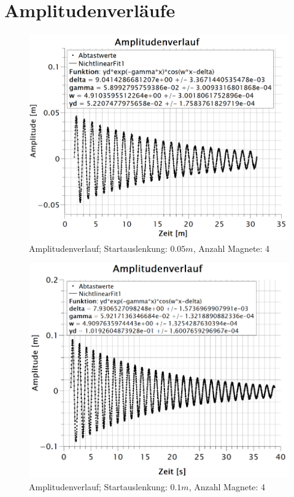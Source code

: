 \section*{Amplitudenverläufe}
\begin{figure}[h]
\centering
\includegraphics[scale=1]{Bilder/amplitudenverlauf_005_4.png} 
\caption{Amplitudenverlauf; Startauslenkung: $0.05m$, Anzahl Magnete: 4}
\label{fig:amplitudenverlauf_005_4}
\end{figure}
\newpage
\begin{figure}[h]
\centering
\includegraphics[scale=1.1]{Bilder/amplitudenverlauf_01_4.png} 
\caption{Amplitudenverlauf; Startauslenkung: $0.1m$, Anzahl Magnete: 4}
\label{fig:amplitudenverlauf_01_4}
\end{figure}
